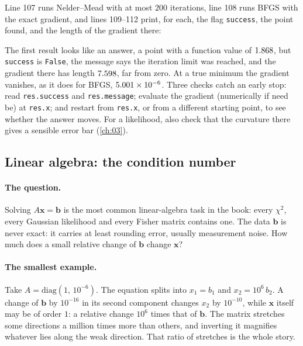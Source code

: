
Line 107 runs Nelder--Mead with at most $200$ iterations, line 108 runs BFGS with the exact gradient, and lines 109--112 print, for each, the flag \texttt{success}, the point found, and the length of the gradient there:


The first result looks like an answer, a point with a function value of $1.868$, but \texttt{success} is \texttt{False}, the message says the iteration limit was reached, and the gradient there has length $7.598$, far from zero. At a true minimum the gradient vanishes, as it does for BFGS, $5.001\times10^{-6}$. Three checks catch an early stop: read \texttt{res.success} and \texttt{res.message}; evaluate the gradient (numerically if need be) at \texttt{res.x}; and restart from \texttt{res.x}, or from a different starting point, to see whether the answer moves. For a likelihood, also check that the curvature there gives a sensible error bar (\cref{ch:03}).

\subsection{Linear algebra: the condition number}
\label{T0a:sec:trust-linalg}

\paragraph{The question.} Solving $A\bm x=\bm b$ is the most common linear-algebra task in the book: every $\chi^2$, every Gaussian likelihood and every Fisher matrix contains one. The data $\bm b$ is never exact: it carries at least rounding error, usually measurement noise. How much does a small relative change of $\bm b$ change $\bm x$?

\paragraph{The smallest example.} Take $A=\mathrm{diag}(1,\,10^{-6})$. The equation splits into $x_1=b_1$ and $x_2=10^6\,b_2$. A change of $\bm b$ by $10^{-16}$ in its second component changes $x_2$ by $10^{-10}$, while $\bm x$ itself may be of order $1$: a relative change $10^{6}$ times that of $\bm b$. The matrix stretches some directions a million times more than others, and inverting it magnifies whatever lies along the weak direction. That ratio of stretches is the whole story.

